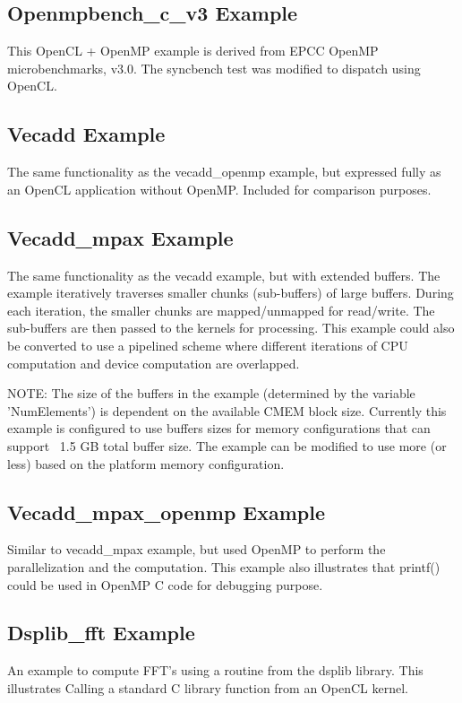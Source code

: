 \documentclass[10pt]{article}
\begin{document}
\subsection{Openmpbench\_c\_v3 Example}\label{openmpbench}
This OpenCL + OpenMP example is derived from EPCC OpenMP microbenchmarks,
v3.0. The syncbench test was modified to dispatch using OpenCL.


\subsection{Vecadd Example}
The same functionality as the vecadd\_openmp example, but expressed fully as an
OpenCL application without OpenMP.  Included for comparison purposes.


\subsection{Vecadd\_mpax Example}\label{vecaddmpax}
The same functionality as the vecadd example, but with extended buffers.  
The example iteratively traverses smaller chunks (sub-buffers) of large buffers.
During each iteration, the smaller chunks are mapped/unmapped for read/write. 
The sub-buffers are then passed to the kernels for processing.  This example
could also be converted to use a pipelined scheme where different iterations of
CPU computation and device computation are overlapped.

NOTE: The size of the buffers in the example (determined by the variable
      'NumElements') is dependent on the available CMEM block size.  
      Currently this example is configured to use buffers sizes for memory
      configurations that can support ~1.5 GB total buffer size. The example
      can be modified to use more (or less) based on the platform memory
      configuration.

\subsection{Vecadd\_mpax\_openmp Example}\label{vecaddmpaxopenmp}
Similar to vecadd\_mpax example, but used OpenMP to perform the parallelization
and the computation.  This example also illustrates that printf() could be used
in OpenMP C code for debugging purpose.

\subsection{Dsplib\_fft Example}\label{dsplibfft}
An example to compute FFT's using a routine from the dsplib library.  This
illustrates Calling a standard C library function from an OpenCL kernel.
\end{document}
